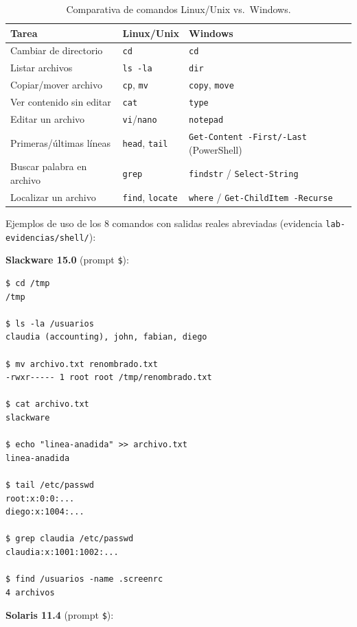 \documentclass[11pt,a4paper]{report}
\begin{document}
\begin{table}[H]
  \centering
  \begin{tabular}{@{}lll@{}}
    \toprule
    \textbf{Tarea} & \textbf{Linux/Unix} & \textbf{Windows} \\
    \midrule
    Cambiar de directorio & \texttt{cd} & \texttt{cd} \\
    Listar archivos & \texttt{ls -la} & \texttt{dir} \\
    Copiar/mover archivo & \texttt{cp}, \texttt{mv} & \texttt{copy}, \texttt{move} \\
    Ver contenido sin editar & \texttt{cat} & \texttt{type} \\
    Editar un archivo & \texttt{vi}/\texttt{nano} & \texttt{notepad} \\
    Primeras/últimas líneas & \texttt{head}, \texttt{tail} & \texttt{Get-Content -First/-Last} (PowerShell) \\
    Buscar palabra en archivo & \texttt{grep} & \texttt{findstr} / \texttt{Select-String} \\
    Localizar un archivo & \texttt{find}, \texttt{locate} & \texttt{where} / \texttt{Get-ChildItem -Recurse} \\
    \bottomrule
  \end{tabular}
  \caption{Comparativa de comandos Linux/Unix vs.\ Windows.}
  \label{tab:shells}
\end{table}

Ejemplos de uso de los 8 comandos con salidas reales abreviadas (evidencia \texttt{lab-evidencias/shell/}):

\textbf{Slackware 15.0} (prompt \texttt{\$}):

\begin{verbatim}
$ cd /tmp
/tmp

$ ls -la /usuarios
claudia (accounting), john, fabian, diego

$ mv archivo.txt renombrado.txt
-rwxr----- 1 root root /tmp/renombrado.txt

$ cat archivo.txt
slackware

$ echo "linea-anadida" >> archivo.txt
linea-anadida

$ tail /etc/passwd
root:x:0:0:...
diego:x:1004:...

$ grep claudia /etc/passwd
claudia:x:1001:1002:...

$ find /usuarios -name .screenrc
4 archivos
\end{verbatim}

\textbf{Solaris 11.4} (prompt \texttt{\$}):
\end{document}
